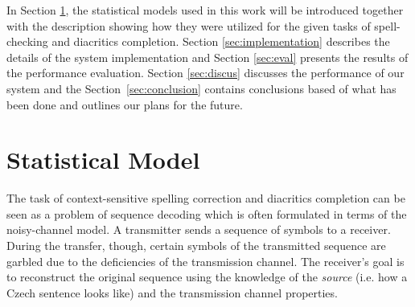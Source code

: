 \documentclass[11pt]{article}
\newcommand{\Sref}[1]{Section~\ref{#1}}
\begin{document}
In Section \ref{sec:statistical_model}, the statistical models used in this
work will be introduced together with the description showing how they were
utilized for the given tasks of spell-checking and diacritics completion.
Section \ref{sec:implementation} describes the details of
the system implementation and Section \ref{sec:eval} presents the results of
the performance evaluation. Section \ref{sec:discus} discusses the performance of our system and 
the \Sref{sec:conclusion} contains 
conclusions based of what has been done and outlines our plans
for the future.

\section{Statistical Model}
\label{sec:statistical_model}
The task of context-sensitive spelling correction and diacritics completion can
be seen as a problem of sequence decoding which is often formulated in
terms of the
noisy-channel model. A transmitter sends a sequence of symbols to a receiver.
During the transfer, though, certain symbols of the transmitted sequence are
garbled due to the deficiencies of the transmission channel. The receiver's
goal is to reconstruct the original sequence using the knowledge of
the \emph{source} (i.e. how a Czech sentence looks like) and the transmission channel properties. 
\end{document}
